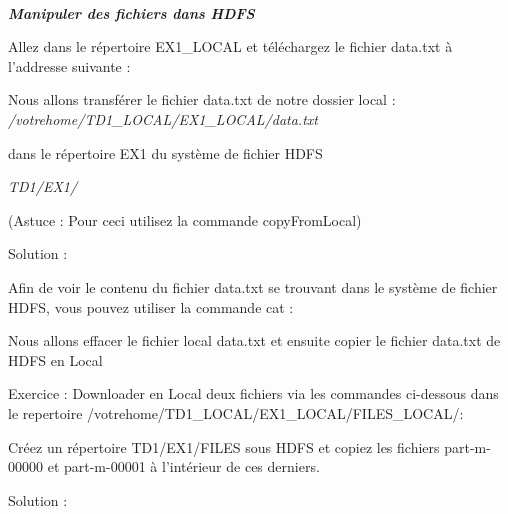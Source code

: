 \documentclass[11pt]{article}
\begin{document}
\paragraph{}
\begin{center}


{\bf \emph{Manipuler des fichiers dans HDFS}} %
\end{center}
Allez dans le répertoire EX1\_LOCAL et téléchargez le fichier data.txt à l'addresse suivante :






Nous allons transférer le fichier data.txt de notre dossier local : \\
\textit{/votrehome/TD1\_LOCAL/EX1\_LOCAL/data.txt}

dans le répertoire EX1 du système de fichier HDFS 

\textit{TD1/EX1/} 

(Astuce : Pour ceci utilisez la commande copyFromLocal) \\
\bigskip
\bigskip
\bigskip

Solution :


Afin de voir le contenu du fichier data.txt se trouvant dans le système de fichier HDFS, vous pouvez utiliser la commande cat :



Nous allons effacer le fichier local data.txt et ensuite copier le fichier data.txt de HDFS en Local




Exercice :
Downloader en Local deux fichiers via les commandes ci-dessous dans le repertoire /votrehome/TD1\_LOCAL/EX1\_LOCAL/FILES\_LOCAL/:



Créez un répertoire TD1/EX1/FILES sous HDFS et copiez les fichiers part-m-00000 et part-m-00001 à l'intérieur de ces derniers.
\bigskip
\bigskip
\bigskip

Solution :

\end{document}
